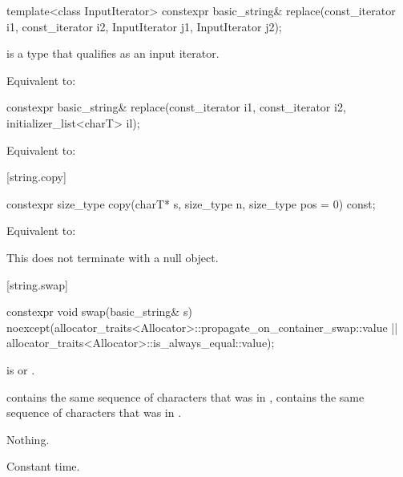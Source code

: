%
\begin{itemdecl}
template<class InputIterator>
  constexpr basic_string& replace(const_iterator i1, const_iterator i2,
                                  InputIterator j1, InputIterator j2);
\end{itemdecl}

\begin{itemdescr}
\pnum
\constraints
{} is a type that qualifies as an input
iterator.

\pnum
\effects
Equivalent to: 
\end{itemdescr}

%
\begin{itemdecl}
constexpr basic_string& replace(const_iterator i1, const_iterator i2, initializer_list<charT> il);
\end{itemdecl}

\begin{itemdescr}
\pnum
\effects
Equivalent to: 
\end{itemdescr}

[string.copy]{}

%
\begin{itemdecl}
constexpr size_type copy(charT* s, size_type n, size_type pos = 0) const;
\end{itemdecl}

\begin{itemdescr}
\pnum
\effects
Equivalent to:
\begin{note}
This does not terminate  with a null object.
\end{note}
\end{itemdescr}

[string.swap]{}

%
\begin{itemdecl}
constexpr void swap(basic_string& s)
  noexcept(allocator_traits<Allocator>::propagate_on_container_swap::value ||
           allocator_traits<Allocator>::is_always_equal::value);
\end{itemdecl}

\begin{itemdescr}
\pnum
\expects
{} is 
or
.

\pnum
\ensures
{}
contains the same sequence of characters that was in ,
 contains the same sequence of characters that was in
.

\pnum
\throws
Nothing.

\pnum
\complexity
Constant time.
\end{itemdescr}

